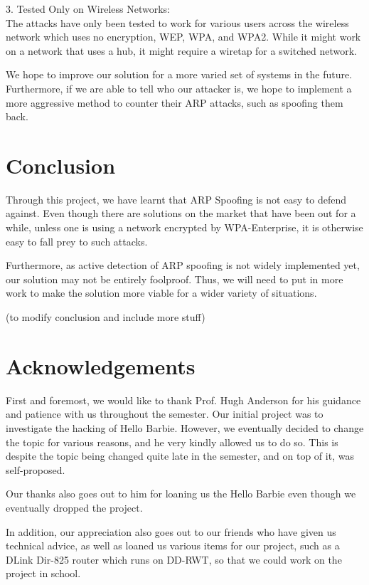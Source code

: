 \documentclass{acm_proc_article-sp}
\begin{document}
3. Tested Only on Wireless Networks:\\
The attacks have only been tested to work for various users across the wireless network which uses no encryption, WEP, WPA, and WPA2. While it might work on a network that uses a hub, it might require a wiretap for a switched network.  

We hope to improve our solution for a more varied set of systems in the future. Furthermore, if we are able to tell who our attacker is, we hope to implement a more aggressive method to counter their ARP attacks, such as spoofing them back. 

\section{Conclusion}
Through this project, we have learnt that ARP Spoofing is not easy to defend against. Even though there are solutions on the market that have been out for a while, unless one is using a network encrypted by WPA-Enterprise, it is otherwise easy to fall prey to such attacks. 

Furthermore, as active detection of ARP spoofing is not widely implemented yet, our solution may not be entirely foolproof. Thus, we will need to put in more work to make the solution more viable for a wider variety of situations. 

(to modify conclusion and include more stuff) 

\section{Acknowledgements}
First and foremost, we would like to thank Prof. Hugh Anderson for his guidance and patience with us throughout the semester. Our initial project was to investigate the hacking of Hello Barbie. However, we eventually decided to change the topic for various reasons, and he very kindly allowed us to do so. This is despite the topic being changed quite late in the semester, and on top of it, was self-proposed. 

Our thanks also goes out to him for loaning us the Hello Barbie even though we eventually dropped the project. 

In addition, our appreciation also goes out to our friends who have given us technical advice, as well as loaned us various items for our project, such as a DLink Dir-825 router which runs on DD-RWT, so that we could work on the project in school. 

%

%
% 
\end{document}
